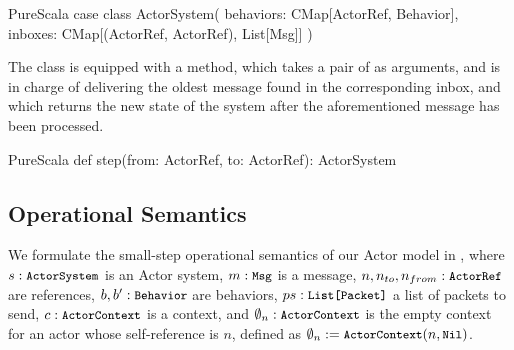 \begin{ShortCode}{PureScala}
case class ActorSystem(
  behaviors: CMap[ActorRef, Behavior],
  inboxes: CMap[(ActorRef, ActorRef), List[Msg]]
)
\end{ShortCode}

The  class is equipped with a  method, which takes 
a pair of \ActorRef as arguments, and is in charge of delivering the oldest message 
found in the corresponding inbox, and which returns the new state of the system after 
the aforementioned message has been processed.

\begin{ShortCode}{PureScala}
def step(from: ActorRef, to: ActorRef): ActorSystem
\end{ShortCode}

\subsection{Operational Semantics}
\label{semantics}

We formulate the small-step operational semantics of our Actor model in 
, where $s: \texttt{\small{ActorSystem}}$ is an Actor system,
$m: \texttt{\small{Msg}}$ is a message,
$n, n_{to}, n_{from}: \texttt{\small{ActorRef}}$ are references,
$b, b': \texttt{\small{Behavior}}$ are behaviors,
$ps: \texttt{\small{List[Packet]}}$ a list of packets to send,
$c: \texttt{\small{ActorContext}}$ is a context,
and $\emptyset_n: \texttt{\small{ActorContext}}$ is the empty context for an actor whose
self-reference is $n$, defined as $\emptyset_n := \texttt{\small{ActorContext}}(n, \texttt{\small{Nil}})$.

